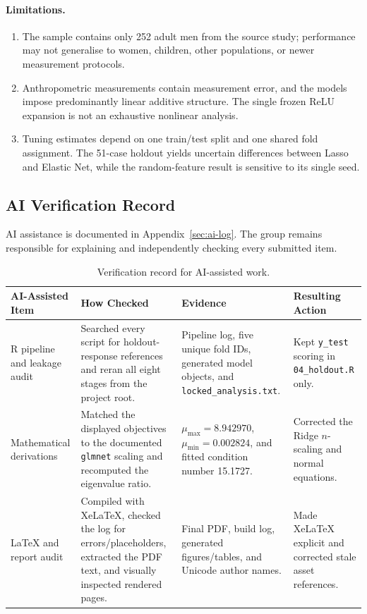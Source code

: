 \paragraph{Limitations.}
\begin{enumerate}
 \item The sample contains only 252 adult men from the source study; performance
       may not generalise to women, children, other populations, or newer
       measurement protocols.
 \item Anthropometric measurements contain measurement error, and the models
       impose predominantly linear additive structure.  The single frozen ReLU
       expansion is not an exhaustive nonlinear analysis.
 \item Tuning estimates depend on one train/test split and one shared fold
       assignment.  The 51-case holdout yields uncertain differences between
       Lasso and Elastic Net, while the random-feature result is sensitive to
       its single seed.
\end{enumerate}

\subsection{AI Verification Record}
\label{sec:ai-verification}

AI assistance is documented in Appendix~\ref{sec:ai-log}.  The group remains
responsible for explaining and independently checking every submitted item.

\begin{table}[H]
\centering
\small
\caption{Verification record for AI-assisted work.}
\label{tab:ai-verification}
\begin{tabularx}{\textwidth}{>{\raggedright\arraybackslash}p{} X X
  >{\raggedright\arraybackslash}p{}}
\toprule
\textbf{AI-Assisted Item} & \textbf{How Checked} & \textbf{Evidence} &
\textbf{Resulting Action} \\
\midrule
R pipeline and leakage audit &
Searched every script for holdout-response references and reran all eight
stages from the project root. &
Pipeline log, five unique fold IDs, generated model objects, and
\texttt{locked\_analysis.txt}. &
Kept \texttt{y\_test} scoring in \texttt{04\_holdout.R} only. \\[4pt]
Mathematical derivations &
Matched the displayed objectives to the documented \texttt{glmnet} scaling and
recomputed the eigenvalue ratio. &
$\mu_{\max}=8.942970$, $\mu_{\min}=0.002824$, and fitted condition number
15.1727. &
Corrected the Ridge $n$-scaling and normal equations. \\[4pt]
LaTeX and report audit &
Compiled with XeLaTeX, checked the log for errors/placeholders, extracted the
PDF text, and visually inspected rendered pages. &
Final PDF, build log, generated figures/tables, and Unicode author names. &
Made XeLaTeX explicit and corrected stale asset references. \\
\bottomrule
\end{tabularx}
\end{table}
